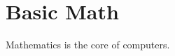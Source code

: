 \documentclass[book.tex]{subfiles}
\begin{document}
\chapter{Basic Math}

Mathematics is the core of computers.
\end{document}
